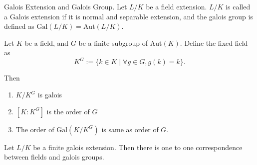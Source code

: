 \documentclass[../book.tex]{subfiles}
\begin{document}
\begin{dfn} Galois Extension and Galois Group.
Let $L/K$ be a field extension. $L/K$ is called a Galois extension if it is normal and separable extension, and the galois group is defined as $\text{Gal}(L/K)=\text{Aut}(L/K)$.
\end{dfn}
\begin{lem}
Let $K$ be a field, and $G$ be a finite subgroup of $\text{Aut}(K)$. Define the fixed field as
\[K^{G}:=\{k \in K \mid \forall g \in G, g(k)=k\}. \]

Then 
\begin{enumerate}
    \item $K/K^{G}$ is galois
    \item $[K:K^{G}]$ is the order of $G$
    \item The order of $\text{Gal}(K/K^G)$ is same as order of $G$.
\end{enumerate}
\end{lem}

\begin{thm}
Let $L/K$ be a finite galois extension. Then there is one to one correspondence between fields and galois groups.


\end{thm}
\end{document}
